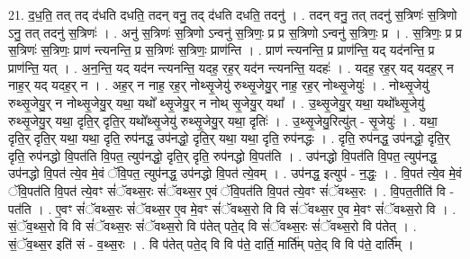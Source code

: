 \documentclass[17pt]{extarticle}
\begin{document}
21. द॒ध॒ति॒ तत् तद् द॑धति दधति॒ तदन् वनु॒ तद् द॑धति दधति॒ तदनु॑ । . तदन् वनु॒ तत् तदनु॑ स॒त्रिणः॑ स॒त्रिणो ऽनु॒ तत् तदनु॑ स॒त्रिणः॑ । . अनु॑ स॒त्रिणः॑ स॒त्रिणो ऽन्वनु॑ स॒त्रिणः॒ प्र प्र स॒त्रिणो ऽन्वनु॑ स॒त्रिणः॒ प्र । . स॒त्रिणः॒ प्र प्र स॒त्रिणः॑ स॒त्रिणः॒ प्राण॑ न्त्यनन्ति॒ प्र स॒त्रिणः॑ स॒त्रिणः॒ प्राण॑न्ति । . प्राण॑ न्त्यनन्ति॒ प्र प्राण॑न्ति॒ यद् यद॑नन्ति॒ प्र प्राण॑न्ति॒ यत् । . अ॒न॒न्ति॒ यद् यद॑न न्त्यनन्ति॒ यदह॒ रह॒र् यद॑न न्त्यनन्ति॒ यदहः॑ । . यदह॒ रह॒र् यद् यदह॒र् न नाह॒र् यद् यदह॒र् न । . अह॒र् न नाह॒ रह॒र् नोथ्सृ॒जेयु॑ रुथ्सृ॒जेयु॒र् नाह॒ रह॒र् नोथ्सृ॒जेयुः॑ । . नोथ्सृ॒जेयु॑ रुथ्सृ॒जेयु॒र् न नोथ्सृ॒जेयु॒र् यथा॒ यथो᳚ थ्सृ॒जेयु॒र् न नोथ् सृ॒जेयु॒र् यथा᳚ । . उ॒थ्सृ॒जेयु॒र् यथा॒ यथो᳚थ्सृ॒जेयु॑ रुथ्सृ॒जेयु॒र् यथा॒ दृति॒र् दृति॒र् यथो᳚थ्सृ॒जेयु॑ रुथ्सृ॒जेयु॒र् यथा॒ दृतिः॑ । . उ॒थ्सृ॒जेयु॒रित्यु॑त् - सृ॒जेयुः॑ । . यथा॒ दृति॒र् दृति॒र् यथा॒ यथा॒ दृति॒ रुप॑नद्ध॒ उप॑नद्धो॒ दृति॒र् यथा॒ यथा॒ दृति॒ रुप॑नद्धः । . दृति॒ रुप॑नद्ध॒ उप॑नद्धो॒ दृति॒र् दृति॒ रुप॑नद्धो वि॒पत॑ति वि॒पत॒ त्युप॑नद्धो॒ दृति॒र् दृति॒ रुप॑नद्धो वि॒पत॑ति । . उप॑नद्धो वि॒पत॑ति वि॒पत॒ त्युप॑नद्ध॒ उप॑नद्धो वि॒पत॑ त्ये॒व मे॒वं ॅवि॒पत॒ त्युप॑नद्ध॒ उप॑नद्धो वि॒पत॑ त्ये॒वम् । . उप॑नद्ध॒ इत्युप॑ - न॒द्धः॒ । . वि॒पत॑ त्ये॒व मे॒वं ॅवि॒पत॑ति वि॒पत॑ त्ये॒वꣳ सं॑ॅवथ्स॒रः सं॑ॅवथ्स॒र ए॒वं ॅवि॒पत॑ति वि॒पत॑ त्ये॒वꣳ सं॑ॅवथ्स॒रः । . वि॒पत॒तीति॑ वि - पत॑ति । . ए॒वꣳ सं॑ॅवथ्स॒रः सं॑ॅवथ्स॒र ए॒व मे॒वꣳ सं॑ॅवथ्स॒रो वि वि सं॑ॅवथ्स॒र ए॒व मे॒वꣳ सं॑ॅवथ्स॒रो वि । . सं॒ॅव॒थ्स॒रो वि वि सं॑ॅवथ्स॒रः सं॑ॅवथ्स॒रो वि प॑तेत् पते॒द् वि सं॑ॅवथ्स॒रः सं॑ॅवथ्स॒रो वि प॑तेत् । . सं॒ॅव॒थ्स॒र इति॑ सं - व॒थ्स॒रः । . वि प॑तेत् पते॒द् वि वि प॑ते॒ दार्ति॒ मार्ति॑म् पते॒द् वि वि प॑ते॒ दार्ति᳚म् । \newline
\end{document}
